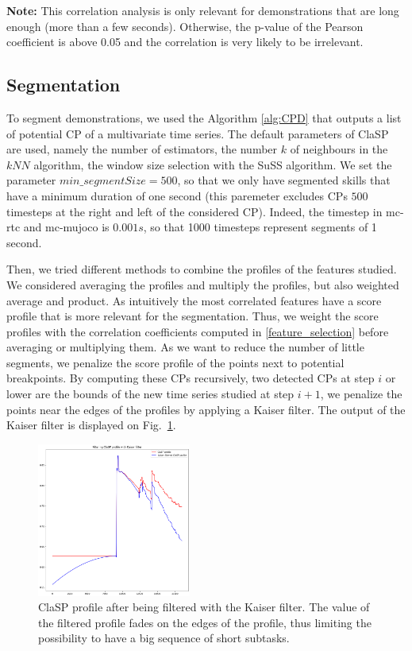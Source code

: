 \documentclass[conference]{IEEEtran}
\begin{document}
\textbf{Note:} This correlation analysis is only relevant for demonstrations that are long enough (more than a few seconds). Otherwise, the p-value of the Pearson coefficient \cite{pearson} is above 0.05 and the correlation is very likely to be irrelevant.

\subsection{Segmentation} \label{method_segmentation}

To segment demonstrations, we used the  Algorithm \ref{alg:CPD} that outputs a list  of potential CP of a multivariate time series. The default parameters of  ClaSP are used, namely the  number of estimators, the number $k$ of neighbours in the $kNN$ algorithm, the window size selection with the  SuSS algorithm. We set the parameter $min\_segmentSize = 500$, so that we only have segmented skills that have a minimum duration of one second (this paremeter excludes CPs $500$ timesteps at the right and left of the considered CP). Indeed, the timestep in mc-rtc and mc-mujoco \cite{singh2023mc} is $0.001s$, so that 1000 timesteps represent segments of 1 second. 

Then, we tried different methods to combine the profiles of the features studied. We considered averaging the profiles and multiply the profiles, but also weighted average and product. As intuitively the most correlated features have a score profile that is more relevant for the segmentation. Thus, we weight the score profiles with the correlation coefficients computed in \ref{feature_selection} before averaging or multiplying them. As we want to reduce the number of little segments, we penalize the score profile of the points next to potential breakpoints. By computing these CPs recursively, two detected CPs at step $i$ or lower are the bounds of the new time series studied at step $i+1$, we penalize the points near the edges of the profiles by applying a Kaiser filter. The output of the Kaiser filter is displayed on Fig.~\ref{fig:Kaiser}.

\begin{figure}[ht]
  \centering
  \includegraphics[width=0.45\textwidth, height=2.5
in]{img/resolKaiser.png}
  \caption{ClaSP profile after being filtered with the Kaiser filter. The value of the filtered profile fades on the edges of the profile, thus limiting the possibility to have a big sequence of short subtasks.}
  \label{fig:Kaiser}
\end{figure}
\end{document}
